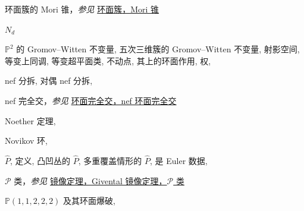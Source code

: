 \begin{theindex}
\subitem \leavevmode\hypertarget{idx:0912}{环面簇的 Mori 锥}，\textit{参见} \hyperlink{idx:1372}{环面簇，Mori 锥}
\indexspace
\item \leavevmode\hypertarget{idx:0925}{$N_d$}
\subitem \leavevmode\hypertarget{idx:0926}{$\mathbb P^2$ 的 Gromov--Witten 不变量},\enspace{}
\subitem \leavevmode\hypertarget{idx:0927}{五次三维簇的 Gromov--Witten 不变量},\enspace{}
\subitem \leavevmode\hypertarget{idx:0928}{射影空间},\enspace{}
\subsubitem \leavevmode\hypertarget{idx:0929}{等变上同调},\enspace{}
\subsubitem \leavevmode\hypertarget{idx:0930}{等变超平面类},\enspace{}
\subsubitem \leavevmode\hypertarget{idx:0931}{不动点},\enspace{}
\subsubitem \leavevmode\hypertarget{idx:0932}{其上的环面作用},\enspace{}
\subsubitem \leavevmode\hypertarget{idx:0933}{权},\enspace{}
\indexspace
\item \leavevmode\hypertarget{idx:0935}{nef 分拆},\enspace{}
\subitem \leavevmode\hypertarget{idx:0936}{对偶 nef 分拆},\enspace{}
\indexspace
\item \leavevmode\hypertarget{idx:0934}{nef 完全交}，\textit{参见} \hyperlink{idx:1349}{环面完全交，nef 环面完全交}
\indexspace
\item \leavevmode\hypertarget{idx:0941}{Noether 定理},\enspace{}
\indexspace
\item \leavevmode\hypertarget{idx:0955}{Novikov 环},\enspace{}
\indexspace
\item \leavevmode\hypertarget{source:488}{}\hypertarget{idx:1043}{$\widehat P$},\enspace{}
\subitem \leavevmode\hypertarget{idx:1044}{定义},\enspace{}
\subitem \leavevmode\hypertarget{idx:1045}{凸凹丛的 $\widehat P$},\enspace{}
\subitem \leavevmode\hypertarget{idx:1046}{多重覆盖情形的 $\widehat P$},\enspace{}
\subitem \leavevmode\hypertarget{idx:1047}{是 Euler 数据},\enspace{}
\indexspace
\item \leavevmode\hypertarget{idx:0123}{$\mathcal P$ 类}，\textit{参见} \hyperlink{idx:0847}{镜像定理，Givental 镜像定理，$\mathcal P$ 类}
\indexspace
\item \leavevmode\hypertarget{idx:1001}{$\mathbb P(1,1,2,2,2)$ 及其环面爆破},\enspace{}

\end{theindex}

